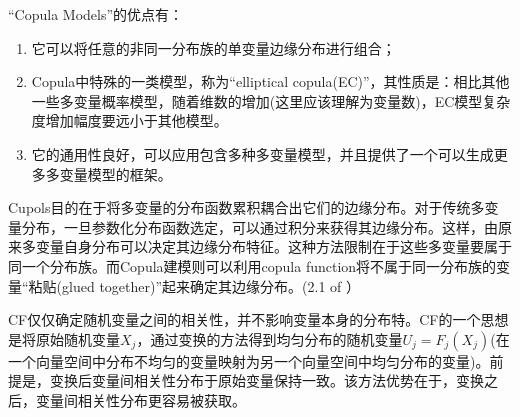 ``Copula Models''的优点有\cite{Smith2009}：
\begin{enumerate}
    \item 它可以将任意的非同一分布族的单变量边缘分布进行组合；
    \item Copula中特殊的一类模型，称为``elliptical copula(EC)''，其性质是：相比其他一些多变量概率模型，随着维数的增加(这里应该理解为变量数)，EC模型复杂度增加幅度要远小于其他模型。
    \item 它的通用性良好，可以应用包含多种多变量模型，并且提供了一个可以生成更多多变量模型的框架。
\end{enumerate}

\textcolor[rgb]{1,0,0}{Cupols目的在于将多变量的分布函数累积耦合出它们的边缘分布。对于传统多变量分布，一旦参数化分布函数选定，可以通过积分来获得其边缘分布。这样，由原来多变量自身分布可以决定其边缘分布特征。这种方法限制在于这些多变量要属于同一个分布族。而Copula建模则可以利用copula function将不属于同一分布族的变量``粘贴(glued together)''起来确定其边缘分布。(2.1 of \cite{Smith2009}}）



CF仅仅确定随机变量之间的相关性，并不影响变量本身的分布特。CF的一个思想是将原始随机变量$X_j$，通过变换的方法得到均匀分布的随机变量$U_j = F_j(X_j)$(在一个向量空间中分布不均匀的变量映射为另一个向量空间中均匀分布的变量)。前提是，变换后变量间相关性分布于原始变量保持一致。该方法优势在于，变换之后，变量间相关性分布更容易被获取。




